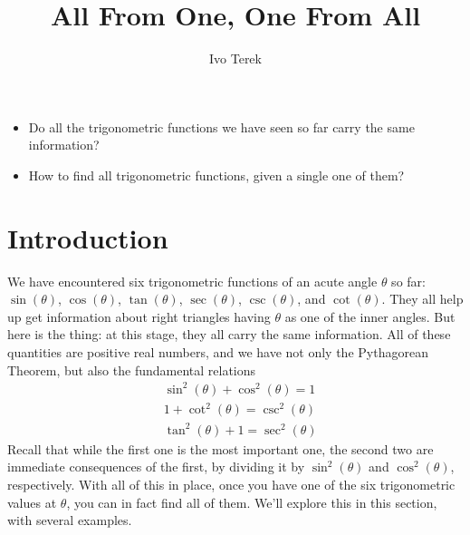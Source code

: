 \documentclass{ximera}
\author{Ivo Terek}
\title{All From One, One From All}
\begin{document}
\begin{abstract}
  
\end{abstract}
\maketitle



\begin{motivatingQuestions}\begin{itemize}
\item Do all the trigonometric functions we have seen so far carry the same information?
\item How to find all trigonometric functions, given a single one of them?
\end{itemize}\end{motivatingQuestions}



\section{Introduction}

We have encountered six trigonometric functions of an acute angle $\theta$ so far: $\sin(\theta)$, $\cos(\theta)$, $\tan(\theta)$, $\sec(\theta)$, $\csc(\theta)$, and $\cot(\theta)$. They all help up get information about right triangles having $\theta$ as one of the inner angles. But here is the thing: at this stage, they all carry the same information. All of these quantities are positive real numbers, and we have not only the Pythagorean Theorem, but also the fundamental relations
\begin{align*}
  &\sin^2(\theta) + \cos^2(\theta) =1 \\ &1+\cot^2(\theta) = \csc^2(\theta) \\ &\tan^2(\theta) + 1 = \sec^2(\theta)
\end{align*}
Recall that while the first one is the most important one, the second two are immediate consequences of the first, by dividing it by $\sin^2(\theta)$ and $\cos^2(\theta)$, respectively. With all of this in place, once you have one of the six trigonometric values at $\theta$, you can in fact find all of them. We'll explore this in this section, with several examples.
\end{document}

